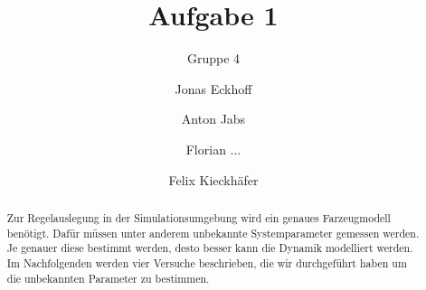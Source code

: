 \documentclass{scrartcl}
\begin{document}
\title{Aufgabe 1}
\subtitle{Gruppe 4}
\author{
  Jonas Eckhoff
  \and
  Anton Jabs
  \and
  Florian ...
  \and
  Felix Kieckhäfer
}

\maketitle

\begin{abstract}
Zur Regelauslegung in der Simulationsumgebung wird ein genaues Farzeugmodell benötigt. Dafür müssen unter anderem unbekannte Systemparameter gemessen werden. Je genauer diese bestimmt werden, desto besser kann die Dynamik modelliert werden. Im Nachfolgenden werden vier Versuche beschrieben, die wir durchgeführt haben um die unbekannten Parameter zu bestimmen. 
\end{abstract}







\end{document}
